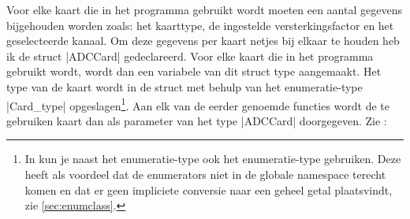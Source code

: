 \begin{cpplstShortInline}
Voor elke kaart die in het programma gebruikt wordt moeten een aantal gegevens bijgehouden worden zoals: het kaarttype, de ingestelde versterkingsfactor en het geselecteerde kanaal.
Om deze gegevens per kaart netjes bij elkaar te houden heb ik de struct |ADCCard| gedeclareerd.
Voor elke kaart die in het programma gebruikt wordt, wordt dan een variabele van dit struct type aangemaakt.
Het type van de kaart wordt in de struct met behulp van het enumeratie-type |Card_type| opgeslagen\footnote{%
	In \Cpp{} kun je naast het enumeratie-type  ook het enumeratie-type  gebruiken.
	Deze  heeft als voordeel dat de enumerators niet in de globale namespace terecht komen en dat er geen impliciete conversie naar een geheel getal plaatsvindt,
	zie \cref{sec:enumclass}.
}. 
Aan elk van de eerder genoemde functies wordt de te gebruiken kaart dan als parameter van het type |ADCCard| doorgegeven. Zie :




\end{cpplstShortInline}
